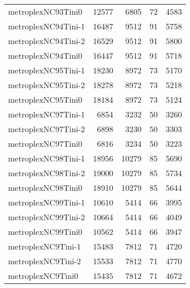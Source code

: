 \begin{longtable}{lrrrr}
metroplexNC93Tini0 & 12577 & 6805 & 72 & 4583 \\
metroplexNC94Tini-1 & 16487 & 9512 & 91 & 5758 \\
metroplexNC94Tini-2 & 16529 & 9512 & 91 & 5800 \\
metroplexNC94Tini0 & 16447 & 9512 & 91 & 5718 \\
metroplexNC95Tini-1 & 18230 & 8972 & 73 & 5170 \\
metroplexNC95Tini-2 & 18278 & 8972 & 73 & 5218 \\
metroplexNC95Tini0 & 18184 & 8972 & 73 & 5124 \\
metroplexNC97Tini-1 & 6854 & 3232 & 50 & 3260 \\
metroplexNC97Tini-2 & 6898 & 3230 & 50 & 3303 \\
metroplexNC97Tini0 & 6816 & 3234 & 50 & 3223 \\
metroplexNC98Tini-1 & 18956 & 10279 & 85 & 5690 \\
metroplexNC98Tini-2 & 19000 & 10279 & 85 & 5734 \\
metroplexNC98Tini0 & 18910 & 10279 & 85 & 5644 \\
metroplexNC99Tini-1 & 10610 & 5414 & 66 & 3995 \\
metroplexNC99Tini-2 & 10664 & 5414 & 66 & 4049 \\
metroplexNC99Tini0 & 10562 & 5414 & 66 & 3947 \\
metroplexNC9Tini-1 & 15483 & 7812 & 71 & 4720 \\
metroplexNC9Tini-2 & 15533 & 7812 & 71 & 4770 \\
metroplexNC9Tini0 & 15435 & 7812 & 71 & 4672 \\
\end{longtable}
